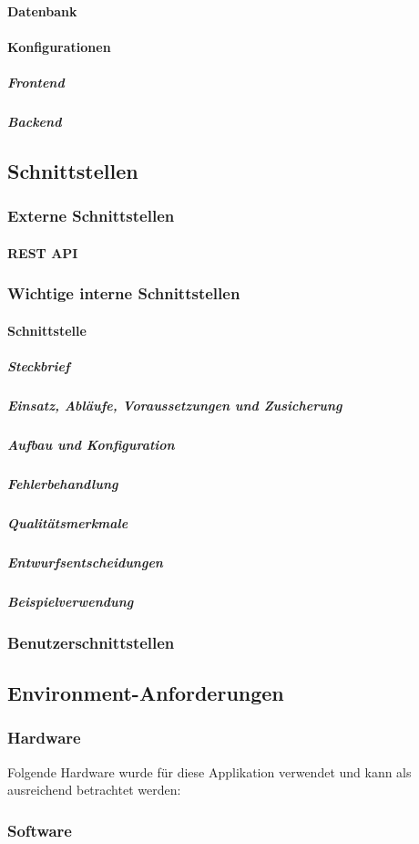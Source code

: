 \paragraph{Datenbank}
\paragraph{Konfigurationen}
\subparagraph{Frontend}

\newpage
\subparagraph{Backend}
\newpage
\subsection{Schnittstellen}

\subsubsection{Externe Schnittstellen}
\paragraph{REST API}

\subsubsection{Wichtige interne Schnittstellen}


\paragraph{Schnittstelle}
\subparagraph{Steckbrief}

\subparagraph{Einsatz, Abläufe, Voraussetzungen und Zusicherung}

\subparagraph{Aufbau und Konfiguration}

\subparagraph{Fehlerbehandlung}

\subparagraph{Qualitätsmerkmale}
\subparagraph{Entwurfsentscheidungen}

\subparagraph{Beispielverwendung}

\subsubsection{Benutzerschnittstellen}

\subsection{Environment-Anforderungen}\label{environmentanforderungen}

\subsubsection{Hardware}
Folgende Hardware wurde für diese Applikation verwendet und kann als ausreichend betrachtet werden:

\subsubsection{Software}

\begin{itemize}

\end{itemize}
\newpage